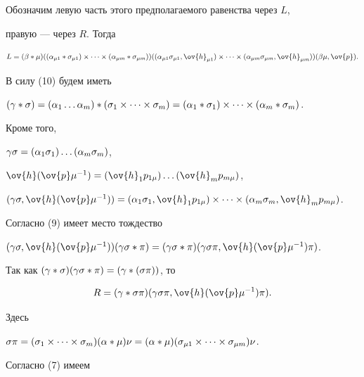 \begin{pf}
\begin{equation}
\end{equation}


Обозначим левую часть этого предполагаемого равенства через $L$,


правую --- через $R$. Тогда


\begin{equation}


L=(\be * \mu) ( (\al_{\mu1} * \s_{\mu1}) \times \dotsb


\times (\al_{\mu{m}} * \s_{\mu{m}}) )


( (\al_{\mu1} \s_{\mu1}, \ov{h}_{\mu1}) \times \dotsb


\times (\al_{\mu{m}} \s_{\mu{m}}, \ov{h}_{\mu{m}}))


(\be \mu, \ov{p}).


\end{equation}


В силу (10) будем иметь


$(\g * \s)=(\al_1 \dotsc \al_m) * (\s_1 \times \dotsb \times \s_m)=


(\al_1 * \s_1) \times \dotsb \times (\al_m * \s_m)$.


Кроме того,


$\gamma\sigma=(\alpha_1\sigma_1) \dotsc (\alpha_m\sigma_m)$,


$\ov{h}(\ov{p}\mu^{-1})=


(\ov{h}_1 p_{1\mu}) \dotsc (\ov{h}_m p_{m\mu})$,


$(\g\s,\ov{h}(\ov{p}\mu^{-1}))=


(\al_1\s_1,\ov{h}_1p_{1\mu})\times\dotsb\times (\al_m\s_m,\ov{h}_m p_{m\mu})$.


Согласно (9) имеет место тождество


$(\g\s,\ov{h}(\ov{p}\mu^{-1}))(\g\s * \pi)=


(\g\s * \pi)(\g\s\pi,\ov{h}(\ov{p}\mu^{-1})\pi)$.


Так как $(\gamma * \sigma)(\gamma\sigma * \pi)=(\gamma * (\sigma\pi))$, то


\begin{equation}


R=(\g * \s\pi)(\g\s\pi,\ov{h}(\ov{p}\mu^{-1})\pi).


\end{equation}


Здесь


$\s\pi=(\s_1 \times \dotsb \times \s_{m})(\al * \mu)\nu=


(\al * \mu)(\s_{\mu1} \times \dotsb \times \s_{\mu{m}})\nu$.


Согласно (7) имеем



\end{pf}
